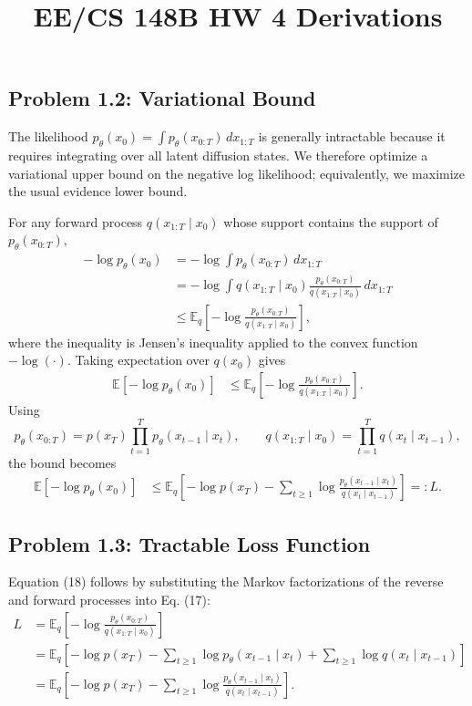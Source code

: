 \documentclass[11pt]{article}
\title{EE/CS 148B HW 4 Derivations}
\author{}
\date{}
\newcommand{\E}{\mathbb{E}}
\begin{document}
\maketitle

\subsection*{Problem 1.2: Variational Bound}
The likelihood $p_\theta(x_0)=\int p_\theta(x_{0:T})\,dx_{1:T}$ is generally intractable because it requires integrating over all latent diffusion states.  We therefore optimize a variational upper bound on the negative log likelihood; equivalently, we maximize the usual evidence lower bound.

For any forward process $q(x_{1:T}\mid x_0)$ whose support contains the support of $p_\theta(x_{0:T})$,
\begin{align*}
-\log p_\theta(x_0)
&= -\log \int p_\theta(x_{0:T})\,dx_{1:T} \\
&= -\log \int q(x_{1:T}\mid x_0)
       \frac{p_\theta(x_{0:T})}{q(x_{1:T}\mid x_0)}\,dx_{1:T} \\
&\leq \E_q\left[-\log
       \frac{p_\theta(x_{0:T})}{q(x_{1:T}\mid x_0)}\right],
\end{align*}
where the inequality is Jensen's inequality applied to the convex function $-\log(\cdot)$.  Taking expectation over $q(x_0)$ gives
\begin{align*}
\E[-\log p_\theta(x_0)]
&\leq
\E_q\left[-\log
       \frac{p_\theta(x_{0:T})}{q(x_{1:T}\mid x_0)}\right].
\end{align*}
Using
\[
p_\theta(x_{0:T})=p(x_T)\prod_{t=1}^T p_\theta(x_{t-1}\mid x_t),
\qquad
q(x_{1:T}\mid x_0)=\prod_{t=1}^T q(x_t\mid x_{t-1}),
\]
the bound becomes
\begin{align*}
\E[-\log p_\theta(x_0)]
&\leq
\E_q\left[
-\log p(x_T)
-\sum_{t\geq 1}
\log \frac{p_\theta(x_{t-1}\mid x_t)}{q(x_t\mid x_{t-1})}
\right]
 =: L.
\end{align*}

\subsection*{Problem 1.3: Tractable Loss Function}
Equation (18) follows by substituting the Markov factorizations of the reverse and forward processes into Eq. (17):
\begin{align*}
L
&=\E_q\left[-\log \frac{p_\theta(x_{0:T})}{q(x_{1:T}\mid x_0)}\right] \\
&=\E_q\left[-\log p(x_T)
-\sum_{t\geq 1}\log p_\theta(x_{t-1}\mid x_t)
+\sum_{t\geq 1}\log q(x_t\mid x_{t-1})\right] \\
&=\E_q\left[-\log p(x_T)
-\sum_{t\geq 1}\log
\frac{p_\theta(x_{t-1}\mid x_t)}{q(x_t\mid x_{t-1})}\right].
\end{align*}
\end{document}
